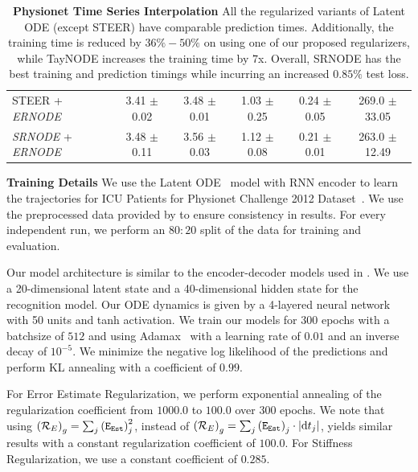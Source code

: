 \begin{table}[t]
\begin{adjustbox}{width=\linewidth,center}
\begin{tabular}{lccccc}
      STEER + \textit{ERNODE}           & 3.41 $\pm$ 0.02                       & 3.48 $\pm$ 0.01                      & 1.03 $\pm$ 0.25         & 0.24 $\pm$ 0.05             & 269.0 $\pm$ 33.05 \\
      \addlinespace
      \textit{SRNODE} + \textit{ERNODE} & 3.48 $\pm$ 0.11                       & 3.56 $\pm$ 0.03                      & 1.12 $\pm$ 0.08         & 0.21 $\pm$ 0.01             & 263.0 $\pm$ 12.49 \\
      \bottomrule
    \end{tabular}
  \end{adjustbox}
  \caption{\textbf{Physionet Time Series Interpolation} All the regularized variants of Latent ODE (except STEER) have comparable prediction times. Additionally, the training time is reduced by $36\% - 50\%$ on using one of our proposed regularizers, while TayNODE increases the training time by $7$x. Overall, SRNODE has the best training and prediction timings while incurring an increased $0.85\%$ test loss.}
  \label{tab:latent_ode_globalreg}
\end{table}

\textbf{Training Details} We use the Latent ODE~\citep{chen2018neural} model with RNN encoder to learn the trajectories for ICU Patients for Physionet Challenge 2012 Dataset~\citep{silva2012predicting}. We use the preprocessed data provided by \citet{kelly2020learning} to ensure consistency in results. For every independent run, we perform an $80:20$ split of the data for training and evaluation.

Our model architecture is similar to the encoder-decoder models used in \citet{rubanova2019latent}. We use a 20-dimensional latent state and a 40-dimensional hidden state for the recognition model. Our ODE dynamics is given by a 4-layered neural network with 50 units and tanh activation. We train our models for $300$ epochs with a batchsize of $512$ and using Adamax~\citep{kingma2017adam} with a learning rate of $0.01$ and an inverse decay of $10^{-5}$. We minimize the negative log likelihood of the predictions and perform KL annealing with a coefficient of $0.99$.

For Error Estimate Regularization, we perform exponential annealing of the regularization coefficient from $1000.0$ to $100.0$ over $300$ epochs. We note that using $\left(\mathcal{R}_{E}\right)_g = \sum_j \left(\texttt{E}_{\texttt{Est}}\right)_j^2$, instead of $\left(\mathcal{R}_{E}\right)_g = \sum_j \left(\texttt{E}_{\texttt{Est}}\right)_j \cdot |\mathrm{d}t_j|$, yields similar results with a constant regularization coefficient of $100.0$. For Stiffness Regularization, we use a constant coefficient of $0.285$.

